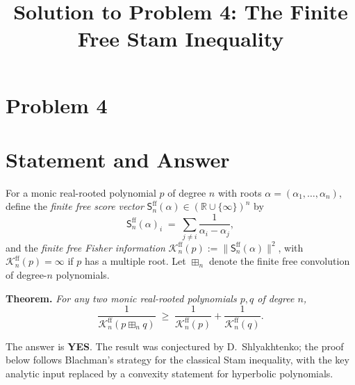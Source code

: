 \clearpage
\section*{Problem 4}
\begingroup
\hypersetup{colorlinks=true,
            linkcolor=blue!50!black,
            citecolor=blue!50!black,
            urlcolor=blue!50!black}
\newcommand{\qfourR}{\mathbb{R}}
\newcommand{\qfourZ}{\mathbb{Z}}
\newcommand{\qfourbn}{\boxplus_n}
\newcommand{\qfourScore}{\mathsf{S}^{\mathrm{ff}}_n}
\newcommand{\qfourInfo}{\mathcal{K}^{\mathrm{ff}}_n}
\newcommand{\qfourRootMap}{\Psi_{\qfourbn}}
\newcommand{\qfourJac}{\mathsf{D}_{\qfourbn}}
\newcommand{\qfourVar}{\operatorname{Var}}
\newcommand{\qfourHess}{\operatorname{Hess}}
\newcommand{\qfourPSD}{\succeq 0}
\newcommand{\qfoursgn}{\operatorname{sgn}}
\newtheorem{qfourtheorem}{Theorem}
\newtheorem{qfourlemma}{Lemma}
\newtheorem{qfourproposition}{Proposition}
\newtheorem{qfourcorollary}{Corollary}
\theoremstyle{definition}
\newtheorem{qfourobservation}{Observation}
\newtheorem{qfourdefinition}{Definition}
\title{Solution to Problem 4: The Finite Free Stam Inequality}
\author{}
\date{}
\maketitle


\section*{Statement and Answer}

For a monic real-rooted polynomial $p$ of degree $n$ with roots
$\alpha=(\alpha_1,\dots,\alpha_n)$, define the \emph{finite free score vector}
$\qfourScore(\alpha)\in(\qfourR\cup\{\infty\})^n$ by
\[
\qfourScore(\alpha)_i \;=\; \sum_{j\ne i}\frac{1}{\alpha_i-\alpha_j},
\]
and the \emph{finite free Fisher information}
$\qfourInfo(p):=\|\qfourScore(\alpha)\|^2$, with $\qfourInfo(p)=\infty$ if $p$ has a
multiple root. Let $\qfourbn$ denote the finite free convolution of degree-$n$
polynomials.

\medskip
\noindent\textbf{Theorem.} \emph{For any two monic real-rooted polynomials
$p,q$ of degree $n$,}
\[
\frac{1}{\qfourInfo(p\qfourbn q)}\;\ge\;\frac{1}{\qfourInfo(p)}+\frac{1}{\qfourInfo(q)}.
\]

\medskip
\noindent The answer is \textbf{YES}. The result was conjectured by
D.~Shlyakhtenko; the proof below follows Blachman's strategy for the classical
Stam inequality, with the key analytic input replaced by a convexity statement
for hyperbolic polynomials.

